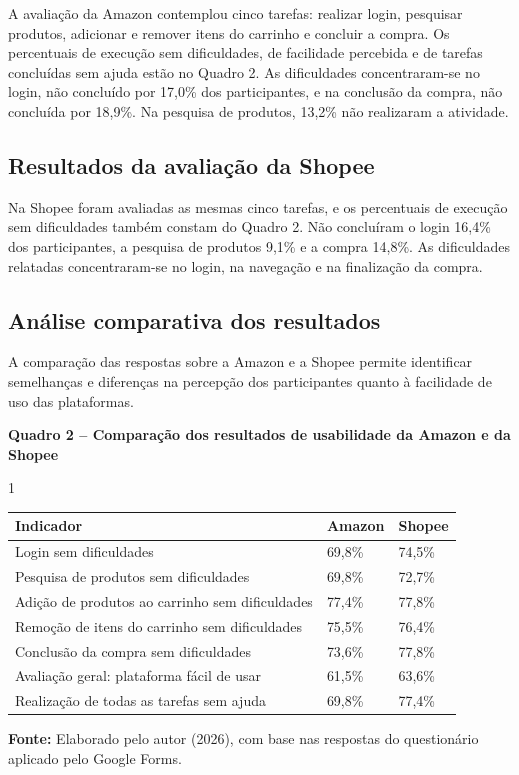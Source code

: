 \documentclass[12pt,a4paper]{article}
\begin{document}
A avaliação da Amazon contemplou cinco tarefas: realizar login, pesquisar produtos, adicionar e remover itens do carrinho e concluir a compra. Os percentuais de execução sem dificuldades, de facilidade percebida e de tarefas concluídas sem ajuda estão no Quadro 2. As dificuldades concentraram-se no login, não concluído por 17,0\% dos participantes, e na conclusão da compra, não concluída por 18,9\%. Na pesquisa de produtos, 13,2\% não realizaram a atividade.

\subsection{Resultados da avaliação da Shopee}

Na Shopee foram avaliadas as mesmas cinco tarefas, e os percentuais de execução sem dificuldades também constam do Quadro 2. Não concluíram o login 16,4\% dos participantes, a pesquisa de produtos 9,1\% e a compra 14,8\%. As dificuldades relatadas concentraram-se no login, na navegação e na finalização da compra.

\subsection{Análise comparativa dos resultados}

A comparação das respostas sobre a Amazon e a Shopee permite identificar semelhanças e diferenças na percepção dos participantes quanto à facilidade de uso das plataformas.

\begin{center}
\textbf{Quadro 2 -- Comparação dos resultados de usabilidade da Amazon e da Shopee}
\end{center}
\enlargethispage{2\baselineskip}
\begin{spacing}{1}
\begin{center}
\begin{tabular}{|p{8.6cm}|p{2.6cm}|p{2.6cm}|}
\hline
\textbf{Indicador} & \textbf{Amazon} & \textbf{Shopee} \\
\hline
Login sem dificuldades & 69,8\% & 74,5\% \\
\hline
Pesquisa de produtos sem dificuldades & 69,8\% & 72,7\% \\
\hline
Adição de produtos ao carrinho sem dificuldades & 77,4\% & 77,8\% \\
\hline
Remoção de itens do carrinho sem dificuldades & 75,5\% & 76,4\% \\
\hline
Conclusão da compra sem dificuldades & 73,6\% & 77,8\% \\
\hline
Avaliação geral: plataforma fácil de usar & 61,5\% & 63,6\% \\
\hline
Realização de todas as tarefas sem ajuda & 69,8\% & 77,4\% \\
\hline
\end{tabular}
\end{center}
\begin{center}
{\small\textbf{Fonte:} Elaborado pelo autor (2026), com base nas respostas do questionário aplicado pelo Google Forms.}
\end{center}
\end{spacing}
\end{document}
